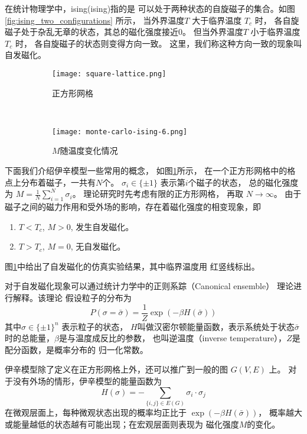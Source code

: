 在统计物理学中，\gls{ising}(\glsdesc{ising})指的是
可以处于两种状态的自旋磁子的集合。如图
\ref{fig:ising_two_configurations} 所示，
当外界温度$T$
大于临界温度 $T_c$ 时，
各自旋磁子处于杂乱无章的状态，其总的磁化强度接近0。
但当外界温度$T$
小于临界温度 $T_c$ 时，
各自旋磁子的状态则变得方向一致。
这里，我们称这种方向一致的现象叫自发磁化。

\begin{figure}
	\centering
	\begin{subfigure}{0.45\textwidth}
		\texttt{[image: square-lattice.png]}
		\caption{正方形网格}\label{fig:square_lattice}
	\end{subfigure}~
	\begin{subfigure}{0.53\textwidth}
		\texttt{[image: monte-carlo-ising-6.png]}
		\caption{$M$随温度变化情况}
	\end{subfigure}
  \caption{}
\end{figure}

下面我们介绍伊辛模型一些常用的概念，
如图\ref{fig:square_lattice}所示，
在一个正方形网格中的格点上分布着磁子，一共有$N$个。
$\sigma_i \in \{ \pm 1\} $ 表示第$i$个磁子的状态，
总的磁化强度为 $M = \frac{1}{N} \sum_{i=1}^N \sigma_i$。
理论研究时先考虑有限的正方形网格， 再取 $N\to \infty$。
由于磁子之间的磁力作用和受外场的影响，存在着磁化强度的相变现象，即
\begin{enumerate}
		\item $T< T_c$, $M>0$, 发生自发磁化。
		\item $T> T_c$, $M=0$, 无自发磁化。
\end{enumerate}
图\ref{fig:square_lattice}中给出了自发磁化的仿真实验结果，其中临界温度用
红竖线标出。

对于自发磁化现象可以通过统计力学中的正则系踪（Canonical ensemble）
理论进行解释。该理论
假设粒子的分布为
\begin{equation}\label{eq:canonical_ensemble}
P(\sigma = \bar{\sigma}) = \frac{1}{Z} \exp(-\beta H(\bar{\sigma}))
\end{equation}
其中$\sigma \in \{\pm 1\}^n$ 表示粒子的状态，
$H$叫做汉密尔顿能量函数，表示系统处于状态$\bar{\sigma}$时的总能量，$\beta$是与温度成反比的参数，
也叫逆温度（inverse temperature），$Z$是配分函数，是概率分布的
归一化常数。

伊辛模型除了定义在正方形网格上外，还可以推广到一般的图 $G(V, E)$ 上。
对于没有外场的情形，伊辛模型的能量函数为
\begin{equation}\label{eq:hamiltonian}
	H(\sigma) = -\sum_{\{i,j\} \in E(G)} \sigma_i \cdot \sigma_j
\end{equation}
在微观层面上，每种微观状态出现的概率均正比于 $\exp(-\beta H(\bar{\sigma}))$，
概率越大或能量越低的状态越有可能出现；在宏观层面则表现为
磁化强度$M$的变化。

